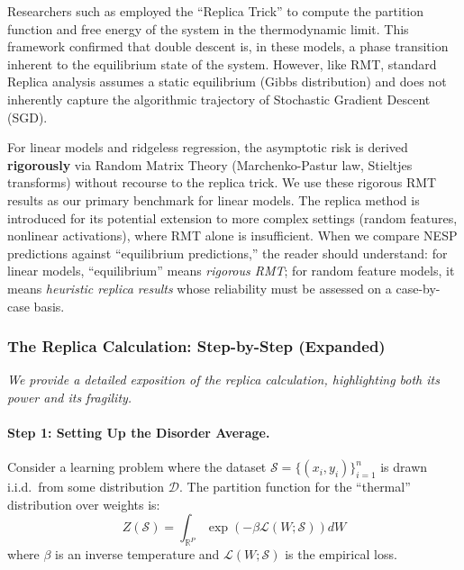 \documentclass[
  journal=largetwo,
  simfonts=false,
  year=2025,
  volume=37,
]{cup-journal}
\begin{document}
Researchers such as \cite{mezard1987spin, gerace2020generalisation} employed the ``Replica Trick'' to compute the partition function and free energy of the system in the thermodynamic limit. This framework confirmed that double descent is, in these models, a phase transition inherent to the equilibrium state of the system. However, like RMT, standard Replica analysis assumes a static equilibrium (Gibbs distribution) and does not inherently capture the algorithmic trajectory of Stochastic Gradient Descent (SGD).

\begin{remark}
For linear models and ridgeless regression, the asymptotic risk is derived \textbf{rigorously} via Random Matrix Theory (Marchenko-Pastur law, Stieltjes transforms) without recourse to the replica trick. We use these rigorous RMT results as our primary benchmark for linear models. The replica method is introduced for its potential extension to more complex settings (random features, nonlinear activations), where RMT alone is insufficient. When we compare NESP predictions against ``equilibrium predictions,'' the reader should understand: for linear models, ``equilibrium'' means \textit{rigorous RMT}; for random feature models, it means \textit{heuristic replica results} whose reliability must be assessed on a case-by-case basis.
\end{remark}

\subsubsection{The Replica Calculation: Step-by-Step (Expanded)}

\textit{We provide a detailed exposition of the replica calculation, highlighting both its power and its fragility.}

\paragraph{Step 1: Setting Up the Disorder Average.}

Consider a learning problem where the dataset $\mathcal{S} = \{(x_i, y_i)\}_{i=1}^n$ is drawn i.i.d.\ from some distribution $\mathcal{D}$. The partition function for the ``thermal'' distribution over weights is:
\begin{equation}
    Z(\mathcal{S}) = \int_{\mathbb{R}^P} \exp\left( -\beta \mathcal{L}(W; \mathcal{S}) \right) dW
\end{equation}
where $\beta$ is an inverse temperature and $\mathcal{L}(W; \mathcal{S})$ is the empirical loss.
\end{document}
